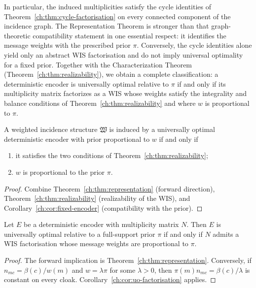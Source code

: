 In particular, the induced multiplicities satisfy the cycle identities
of Theorem~\ref{ch:thm:cycle-factorisation} on every connected component
of the incidence graph.  The Representation Theorem is stronger than
that graph-theoretic compatibility statement in one essential respect:
it identifies the message weights with the prescribed prior $\pi$.
Conversely, the cycle identities alone yield only an abstract WIS
factorisation and do not imply universal optimality for a fixed prior.
Together with the Characterization Theorem (Theorem~\ref{ch:thm:realizability}),
we obtain a complete classification: a deterministic encoder is
universally optimal relative to $\pi$ if and only if its multiplicity
matrix factorizes as a WIS whose weights satisfy the integrality and
balance conditions of Theorem~\ref{ch:thm:realizability} and where $w$ is
proportional to $\pi$.
\begin{corollary}\label{ch:cor:uo-realizability}
A weighted incidence structure $\mathfrak W$ is induced by a universally
optimal deterministic encoder with prior proportional to $w$ if and only if
\begin{enumerate}
\item it satisfies the two conditions of Theorem~\ref{ch:thm:realizability};
\item $w$ is proportional to the prior $\pi$.
\end{enumerate}
\end{corollary}
\begin{proof}
Combine Theorem~\ref{ch:thm:representation} (forward direction),
Theorem~\ref{ch:thm:realizability} (realizability of the WIS), and
Corollary~\ref{ch:cor:fixed-encoder} (compatibility with the prior).
\end{proof}

\begin{corollary}\label{ch:cor:fixed-encoder}
Let $E$ be a deterministic encoder with multiplicity matrix $N$. Then $E$ is universally optimal relative to a full-support prior $\pi$ if and only if $N$ admits a WIS factorisation whose message weights are proportional to $\pi$.
\end{corollary}
\begin{proof}
The forward implication is Theorem~\ref{ch:thm:representation}. Conversely, if $n_{mc}=\beta(c)/w(m)$ and $w=\lambda\pi$ for some $\lambda>0$, then $\pi(m)n_{mc}=\beta(c)/\lambda$ is constant on every cloak. Corollary~\ref{ch:cor:uo-factorisation} applies.
\end{proof}

